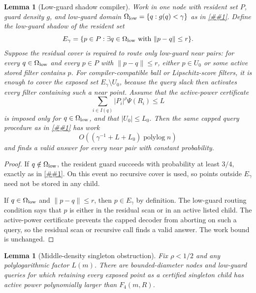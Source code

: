 \documentclass[10pt]{article}
\newcommand{\cref}[1]{\ref{##1}}
\newtheorem{lemma}[theorem]{Lemma}
\theoremstyle{definition}
\newcommand{\polylog}{\operatorname{polylog}}
\begin{document}
\begin{lemma}[Low-guard shadow compiler]\label{lem:low-guard-shadow}
   Work in one node with resident set $P$, guard density $g$, and low-guard
   domain $\Omega_{\rm low}=\{q:g(q)<\gamma\}$ as in
   \cref{lem:guard-restricted-cover}.  Define the low-guard shadow of the
   resident set
   \[
      E_\gamma
      =
      \{p\in P:\exists q\in\Omega_{\rm low}\text{ with }\|p-q\|\le r\}.
   \]
   Suppose the residual cover is required to route only low-guard near pairs:
   for every $q\in\Omega_{\rm low}$ and every $p\in P$ with $\|p-q\|\le r$,
   either $p\in U_0$ or some active stored filter contains $p$.  For
   compiler-compatible ball or Lipschitz-score filters, it is enough to cover
   the exposed set $E_\gamma\setminus U_0$, because the query slack then
   activates every filter containing such a near point.  Assume that the
   active-power certificate
   \[
      \sum_{i\in I(q)} |P_i|^\rho\Psi(R_i)\le L
   \]
   is imposed only for $q\in\Omega_{\rm low}$, and that
   $|U_0|\le L_0$.  Then the same capped query procedure as in
   \cref{lem:guard-restricted-cover} has work
   \[
      O((\gamma^{-1}+L+L_0)\polylog n)
   \]
   and finds a valid answer for every near pair with constant probability.
\end{lemma}

\begin{proof}
   If $q\notin\Omega_{\rm low}$, the resident guard succeeds with probability
   at least $3/4$, exactly as in \cref{lem:guard-restricted-cover}.  On this
   event no recursive cover is used, so points outside $E_\gamma$ need not be
   stored in any child.

   If $q\in\Omega_{\rm low}$ and $\|p-q\|\le r$, then $p\in E_\gamma$ by
   definition.  The low-guard routing condition says that $p$ is either in the
   residual scan or in an active listed child.  The active-power certificate
   prevents the capped decoder from aborting on such a query, so the residual
   scan or recursive call finds a valid answer.  The work bound is unchanged.
\end{proof}

\begin{lemma}[Middle-density singleton obstruction]
   \label{lem:middle-density-singleton-obstruction}
   Fix $\rho<1/2$ and any polylogarithmic factor $L(m)$.  There are
   bounded-diameter nodes and low-guard queries for which retaining every
   exposed point as a certified singleton child has active power polynomially
   larger than $F_4(m,R)$.
\end{lemma}
\end{document}
